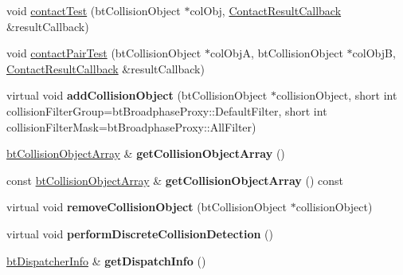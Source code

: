 \begin{DoxyCompactItemize}
\item 
void \hyperlink{classbtCollisionWorld_ae1d167b53de82d4f97a47118f8480999}{contact\+Test} (bt\+Collision\+Object $\ast$col\+Obj, \hyperlink{structbtCollisionWorld_1_1ContactResultCallback}{Contact\+Result\+Callback} \&result\+Callback)
\item 
void \hyperlink{classbtCollisionWorld_aabbec542dcd348041db6d07b36a640c8}{contact\+Pair\+Test} (bt\+Collision\+Object $\ast$col\+ObjA, bt\+Collision\+Object $\ast$col\+ObjB, \hyperlink{structbtCollisionWorld_1_1ContactResultCallback}{Contact\+Result\+Callback} \&result\+Callback)
\item 
\mbox{\label{classbtCollisionWorld_a3ca1134733136dc68691a8cd73196cc6}} 
virtual void {\bfseries add\+Collision\+Object} (bt\+Collision\+Object $\ast$collision\+Object, short int collision\+Filter\+Group=bt\+Broadphase\+Proxy\+::\+Default\+Filter, short int collision\+Filter\+Mask=bt\+Broadphase\+Proxy\+::\+All\+Filter)
\item 
\mbox{\label{classbtCollisionWorld_a43e878669b2e755992acc41fad1cda30}} 
\hyperlink{classbtAlignedObjectArray}{bt\+Collision\+Object\+Array} \& {\bfseries get\+Collision\+Object\+Array} ()
\item 
\mbox{\label{classbtCollisionWorld_a4c4afa92446d6732ee124c4adcb646fb}} 
const \hyperlink{classbtAlignedObjectArray}{bt\+Collision\+Object\+Array} \& {\bfseries get\+Collision\+Object\+Array} () const
\item 
\mbox{\label{classbtCollisionWorld_a4e995146fe0b4ba6ea0024c1ea0380c3}} 
virtual void {\bfseries remove\+Collision\+Object} (bt\+Collision\+Object $\ast$collision\+Object)
\item 
\mbox{\label{classbtCollisionWorld_a7bc2967b5005449b27f55545f224efcd}} 
virtual void {\bfseries perform\+Discrete\+Collision\+Detection} ()
\item 
\mbox{\label{classbtCollisionWorld_aa6e0fa2c310419c6539a84df107a2ac0}} 
\hyperlink{structbtDispatcherInfo}{bt\+Dispatcher\+Info} \& {\bfseries get\+Dispatch\+Info} ()
\item 
\mbox{\label{classbtCollisionWorld_a8daf7d9ed980e8564a17dfa114f92c6d}} 

\end{DoxyCompactItemize}

